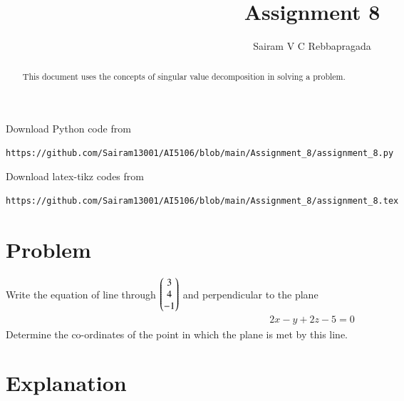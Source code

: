 \documentclass[journal,12pt,twocolumn]{IEEEtran}
\begin{document}
\makeatletter
{}
\makeatother
\let\StandardTheFigure\thefigure
\let\vec\mathbf
\renewcommand{\thefigure}{\theproblem}
\def\putbox#1#2#3{\makebox[0in][l]{\makebox[#1][l]{}\raisebox{\baselineskip}[0in][0in]{\raisebox{#2}[0in][0in]{#3}}}}
     \def\rightbox#1{\makebox[0in][r]{#1}}
     \def\centbox#1{\makebox[0in]{#1}}
     \def\topbox#1{\raisebox{-\baselineskip}[0in][0in]{#1}}
     \def\midbox#1{\raisebox{-0.5\baselineskip}[0in][0in]{#1}}
\vspace{3cm}
\title{Assignment 8}
\author{Sairam V C Rebbapragada}
\maketitle
\newpage
\bigskip
\renewcommand{\thefigure}{\theenumi}
\renewcommand{\thetable}{\theenumi}
\begin{abstract}
This document uses the concepts of singular value decomposition in solving a problem.
\end{abstract}
Download Python code from 
%
\begin{lstlisting}
https://github.com/Sairam13001/AI5106/blob/main/Assignment_8/assignment_8.py
\end{lstlisting}
%
Download latex-tikz codes from 
%
\begin{lstlisting}
https://github.com/Sairam13001/AI5106/blob/main/Assignment_8/assignment_8.tex
\end{lstlisting}
%

\section{Problem}

Write the equation of line through $\begin{pmatrix}3 \\ 4 \\ -1\end{pmatrix}$ and perpendicular to the plane 
\begin{align}
    2x - y + 2z -5 = 0  \label{given_plane_eq}
\end{align}
Determine the co-ordinates of the point in which the plane is met by this line.

\section{Explanation}
\end{document}
